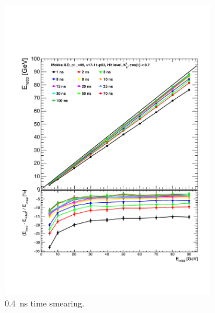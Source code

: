 \begin{figure}[htbp!]
  \centering
  \begin{minipage}{1\textwidth}
    \begin{subfigure}[t]{0.5\textwidth}
      \centering
      \includegraphics[width=1\linewidth]{chap6/fig_TimingILD/0.4ns_Smearing/Linearity_TimeCuts_Smearing0.4ns}
      \vspace{-6ex}
      \caption{\SI{0.4}{\nano\second} time smearing.} \label{fig:Lin0.4ns}
    \end{subfigure}
    \begin{subfigure}[t]{0.5\textwidth}
      \centering

\end{subfigure}
\end{minipage}
\end{figure}

